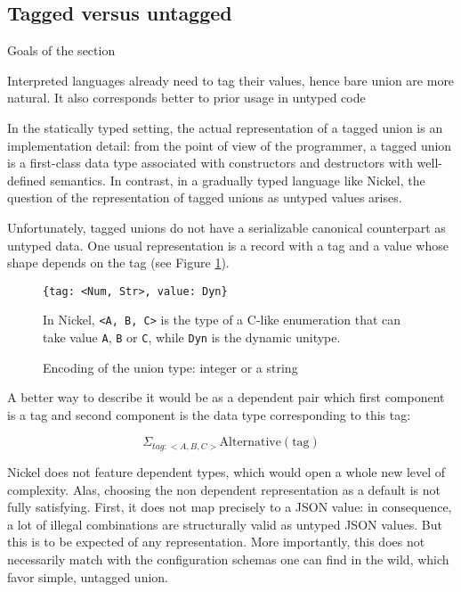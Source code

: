 \documentclass[sigplan,10pt,review,anonymous]{acmart}
\begin{document}
\subsection{Tagged versus untagged}
{\color{red}Goals of the section

Interpreted languages already need to tag their values, hence bare union are more natural.
It also corresponds better to prior usage in untyped code\vspace{0.5cm}}

In the statically typed setting, the actual representation of a tagged union is
an implementation detail: from the point of view of the programmer, a tagged
union is a first-class data type associated with constructors and destructors
with well-defined semantics. In contrast, in a gradually typed language like
Nickel, the question of the representation of tagged unions as untyped values
arises.

Unfortunately, tagged unions do not have a serializable canonical counterpart as
untyped data. One usual representation is a record with a tag and a value whose
shape depends on the tag (see Figure \ref{fig:union-encoding}).

\begin{figure}
  \begin{center}
\begin{lstlisting}[language=nickel]
{tag: <Num, Str>, value: Dyn}
\end{lstlisting}
  \end{center}
\caption{Encoding of the union type: integer or a string}
\label{fig:union-encoding}
\medskip
\small
In Nickel, \lstinline+<A, B, C>+ is the type of a C-like enumeration that can
take value \lstinline+A+, \lstinline+B+ or \lstinline+C+, while \lstinline+Dyn+
is the dynamic unitype.
\end{figure}

A better way to describe it would be as a dependent pair which first component
is a tag and second component is the data type corresponding to this tag:

\[
    \Sigma_{tag : <A, B, C>} \text{Alternative}(\text{tag})
\]

Nickel does not feature dependent types, which would open a whole new level of
complexity. Alas, choosing the non dependent representation as a default is not
fully satisfying.  First, it does not map precisely to a JSON value: in
consequence, a lot of illegal combinations are structurally valid as untyped
JSON values. But this is to be expected of any representation. More importantly,
this does not necessarily match with the configuration schemas one can find in
the wild, which favor simple, untagged union.
\end{document}
